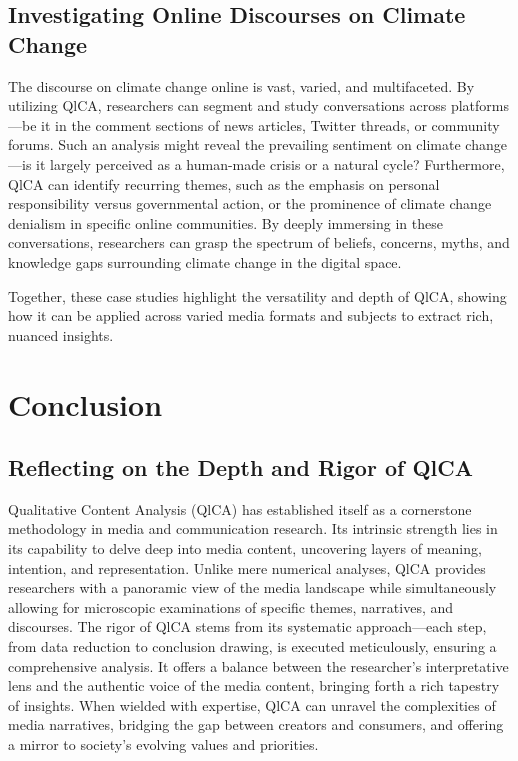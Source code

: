 \documentclass[
  b5paper]{book}
\begin{document}
\hypertarget{investigating-online-discourses-on-climate-change}{%
\subsection*{Investigating Online Discourses on Climate Change}\label{investigating-online-discourses-on-climate-change}}

The discourse on climate change online is vast, varied, and multifaceted. By utilizing QlCA, researchers can segment and study conversations across platforms---be it in the comment sections of news articles, Twitter threads, or community forums. Such an analysis might reveal the prevailing sentiment on climate change---is it largely perceived as a human-made crisis or a natural cycle? Furthermore, QlCA can identify recurring themes, such as the emphasis on personal responsibility versus governmental action, or the prominence of climate change denialism in specific online communities. By deeply immersing in these conversations, researchers can grasp the spectrum of beliefs, concerns, myths, and knowledge gaps surrounding climate change in the digital space.

Together, these case studies highlight the versatility and depth of QlCA, showing how it can be applied across varied media formats and subjects to extract rich, nuanced insights.

\hypertarget{conclusion-2}{%
\section{Conclusion}\label{conclusion-2}}

\hypertarget{reflecting-on-the-depth-and-rigor-of-qlca}{%
\subsection*{Reflecting on the Depth and Rigor of QlCA}\label{reflecting-on-the-depth-and-rigor-of-qlca}}

Qualitative Content Analysis (QlCA) has established itself as a cornerstone methodology in media and communication research. Its intrinsic strength lies in its capability to delve deep into media content, uncovering layers of meaning, intention, and representation. Unlike mere numerical analyses, QlCA provides researchers with a panoramic view of the media landscape while simultaneously allowing for microscopic examinations of specific themes, narratives, and discourses. The rigor of QlCA stems from its systematic approach---each step, from data reduction to conclusion drawing, is executed meticulously, ensuring a comprehensive analysis. It offers a balance between the researcher's interpretative lens and the authentic voice of the media content, bringing forth a rich tapestry of insights. When wielded with expertise, QlCA can unravel the complexities of media narratives, bridging the gap between creators and consumers, and offering a mirror to society's evolving values and priorities.
\end{document}
